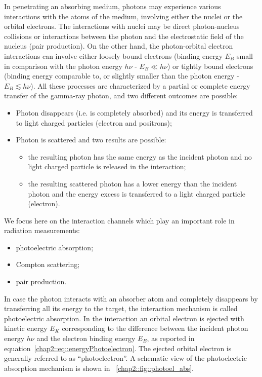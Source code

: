 In penetrating an absorbing medium, photons may experience various interactions with the atoms of the medium, involving either the nuclei or the orbital electrons. The interactions with nuclei may be direct photon-nucleus collisions or interactions between the photon and the electrostatic field of the nucleus (pair production). On the other hand, the photon-orbital electron interactions can involve either loosely bound electrons (binding energy $E_B$ small in comparison with the photon energy $h\nu$ - $E_B \ll h\nu$) or tightly bound electrons (binding energy comparable to, or slightly smaller than the photon energy - $E_B  \lesssim h\nu$). 
All these processes are characterized by a partial or complete energy transfer of the gamma-ray photon, and two different outcomes are possible:
\begin{itemize}
\item Photon disappears (i.e. is completely absorbed) and its energy is transferred to light charged particles (electron and positrons);
\item Photon is scattered and two results are possible:
	\begin{itemize}
		\item the resulting photon has the same energy as the incident photon and no light charged particle is released in the interaction;
		\item the resulting scattered photon has a lower energy than the incident photon and the energy excess is transferred to a light charged particle (electron).
	\end{itemize}
\end{itemize}

We focus here on the interaction channels which play an important role in radiation measurements: 
\begin{itemize}
\item photoelectric absorption;
\item Compton scattering;
\item pair production.
\end{itemize}

In case the photon interacts with an absorber  atom and completely disappears by transferring all its energy to the target, the interaction mechanism is called photoelectric absorption. In the interaction an orbital electron  is ejected with kinetic energy $E_K$ corresponding to the difference between the incident photon energy $h\nu$ and the electron binding energy $E_B$, as reported in equation~\ref{chap2::eq::energyPhotoelectron}. The ejected orbital electron is generally referred to as \enquote{photoelectron}. A schematic view of the photoelectric absorption mechanism is shown in \figurename~\ref{chap2::fig::photoel_abs}.

